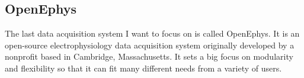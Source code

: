\subsection{OpenEphys}

The last data acquisition system I want to focus on is called OpenEphys. It is an open-source electrophysiology data acquisition system originally developed by a nonprofit based in Cambridge, Massachusetts. It sets a big focus on modularity and flexibility so that it can fit many different needs from a variety of users.\\

